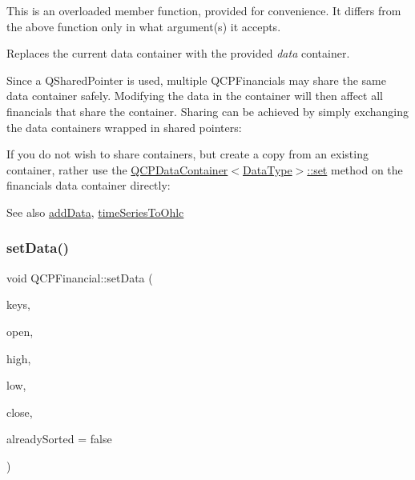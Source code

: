 This is an overloaded member function, provided for convenience. It differs from the above function only in what argument(s) it accepts.

Replaces the current data container with the provided {\itshape data} container.

Since a Q\+Shared\+Pointer is used, multiple Q\+C\+P\+Financials may share the same data container safely. Modifying the data in the container will then affect all financials that share the container. Sharing can be achieved by simply exchanging the data containers wrapped in shared pointers\+: 
\begin{DoxyCodeInclude}
\end{DoxyCodeInclude}
 If you do not wish to share containers, but create a copy from an existing container, rather use the \mbox{\hyperlink{class_q_c_p_data_container_ae7042bd534fc3ce7befa2ce3f790b5bf}{Q\+C\+P\+Data\+Container$<$\+Data\+Type$>$\+::set}} method on the financial\textquotesingle{}s data container directly\+: 
\begin{DoxyCodeInclude}
\end{DoxyCodeInclude}
 \begin{DoxySeeAlso}{See also}
\mbox{\hyperlink{class_q_c_p_financial_a372ac031e44a7a6c912d203556af96f7}{add\+Data}}, \mbox{\hyperlink{class_q_c_p_financial_a9a058c035040d3939b8884f4aaccb1a7}{time\+Series\+To\+Ohlc}} 
\end{DoxySeeAlso}
\mbox{\label{class_q_c_p_financial_a12992e669ed19d7bb48dbe601570cc05}} 
\subsubsection{\texorpdfstring{set\+Data()}{setData()}\hspace{0.1cm}{\footnotesize\ttfamily [2/2]}}
{\footnotesize\ttfamily void Q\+C\+P\+Financial\+::set\+Data (\begin{DoxyParamCaption}\item[{const Q\+Vector$<$ double $>$ \&}]{keys,  }\item[{const Q\+Vector$<$ double $>$ \&}]{open,  }\item[{const Q\+Vector$<$ double $>$ \&}]{high,  }\item[{const Q\+Vector$<$ double $>$ \&}]{low,  }\item[{const Q\+Vector$<$ double $>$ \&}]{close,  }\item[{bool}]{already\+Sorted = {\ttfamily false} }\end{DoxyParamCaption})}

